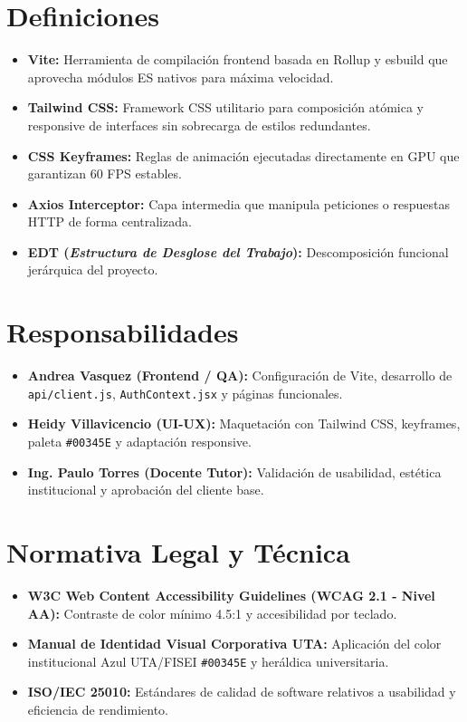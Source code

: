 \documentclass[12pt,a4paper]{article}
\begin{document}
\section{Definiciones}
\begin{itemize}[leftmargin=1.5em, itemsep=2pt, topsep=2pt]
    \item \textbf{Vite:} Herramienta de compilación frontend basada en Rollup y esbuild que aprovecha módulos ES nativos para máxima velocidad.
    \item \textbf{Tailwind CSS:} Framework CSS utilitario para composición atómica y responsive de interfaces sin sobrecarga de estilos redundantes.
    \item \textbf{CSS Keyframes:} Reglas de animación ejecutadas directamente en GPU que garantizan 60 FPS estables.
    \item \textbf{Axios Interceptor:} Capa intermedia que manipula peticiones o respuestas HTTP de forma centralizada.
    \item \textbf{EDT (\textit{Estructura de Desglose del Trabajo}):} Descomposición funcional jerárquica del proyecto.
\end{itemize}

\section{Responsabilidades}
\begin{itemize}[leftmargin=1.5em, itemsep=2pt, topsep=2pt]
    \item \textbf{Andrea Vasquez (Frontend / QA):} Configuración de Vite, desarrollo de \texttt{api/client.js}, \texttt{AuthContext.jsx} y páginas funcionales.
    \item \textbf{Heidy Villavicencio (UI-UX):} Maquetación con Tailwind CSS, keyframes, paleta \texttt{\#00345E} y adaptación responsive.
    \item \textbf{Ing. Paulo Torres (Docente Tutor):} Validación de usabilidad, estética institucional y aprobación del cliente base.
\end{itemize}

\section{Normativa Legal y Técnica}
\begin{itemize}[leftmargin=1.5em, itemsep=2pt]
    \item \textbf{W3C Web Content Accessibility Guidelines (WCAG 2.1 - Nivel AA):} Contraste de color mínimo 4.5:1 y accesibilidad por teclado.
    \item \textbf{Manual de Identidad Visual Corporativa UTA:} Aplicación del color institucional Azul UTA/FISEI \texttt{\#00345E} y heráldica universitaria.
    \item \textbf{ISO/IEC 25010:} Estándares de calidad de software relativos a usabilidad y eficiencia de rendimiento.
\end{itemize}
\end{document}
